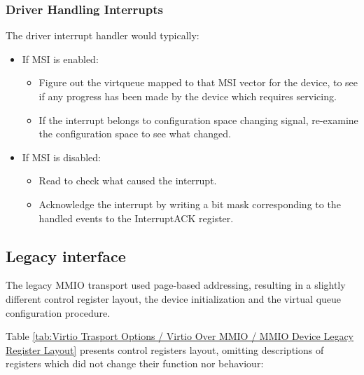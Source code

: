 \subsubsection{Driver Handling Interrupts}\label{sec:Virtio Transport Options / Virtio Over MMIO / MMIO-specific Initialization And Device Operation / Driver Handling Interrupts}

The driver interrupt handler would typically:

\begin{itemize}
  \item If MSI is enabled:
    \begin{itemize}
      \item
        Figure out the virtqueue mapped to that MSI vector for the
        device, to see if any progress has been made by the device
        which requires servicing.
      \item
        If the interrupt belongs to configuration space changing signal,
        re-examine the configuration space to see what changed.
    \end{itemize}
  \item If MSI is disabled:
    \begin{itemize}
      \item Read  to check what caused the interrupt.
      \item Acknowledge the interrupt by writing a bit mask corresponding
            to the handled events to the InterruptACK register.
    \end{itemize}
\end{itemize}

\subsection{Legacy interface}\label{sec:Virtio Transport Options / Virtio Over MMIO / Legacy interface}

The legacy MMIO transport used page-based addressing, resulting
in a slightly different control register layout, the device
initialization and the virtual queue configuration procedure.

Table \ref{tab:Virtio Trasport Options / Virtio Over MMIO / MMIO Device Legacy Register Layout} 
presents control registers layout, omitting
descriptions of registers which did not change their function
nor behaviour:

